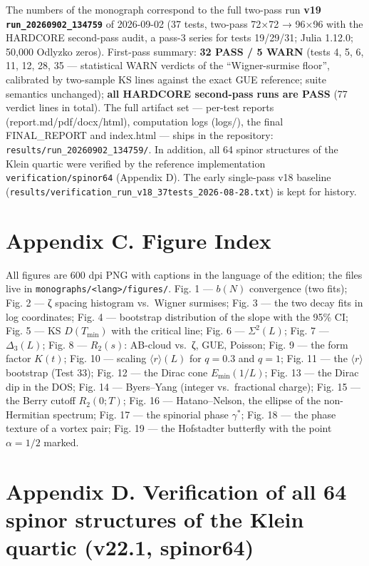 \documentclass[
]{article}
\begin{document}
The numbers of the monograph correspond to the full two-pass run
\textbf{v19 \texttt{run\_20260902\_134759}} of 2026-09-02 (37 tests,
two-pass 72×72 → 96×96 with the HARDCORE second-pass audit, a pass-3
series for tests 19/29/31; Julia 1.12.0; 50,000 Odlyzko zeros).
First-pass summary: \textbf{32 PASS / 5 WARN} (tests 4, 5, 6, 11, 12,
28, 35 --- statistical WARN verdicts of the ``Wigner-surmise floor'',
calibrated by two-sample KS lines against the exact GUE reference; suite
semantics unchanged); \textbf{all HARDCORE second-pass runs are PASS}
(77 verdict lines in total). The full artifact set --- per-test reports
(report.md/pdf/docx/html), computation logs (logs/), the final
FINAL\_REPORT and index.html --- ships in the repository:
\texttt{results/run\_20260902\_134759/}. In addition, all 64 spinor
structures of the Klein quartic were verified by the reference
implementation \texttt{verification/spinor64} (Appendix D). The early
single-pass v18 baseline
(\texttt{results/verification\_run\_v18\_37tests\_2026-08-28.txt}) is
kept for history.

\section{Appendix C. Figure Index}\label{appendix-c.-figure-index}

All figures are 600 dpi PNG with captions in the language of the
edition; the files live in
\texttt{monographs/\textless{}lang\textgreater{}/figures/}. Fig. 1 ---
\(b(N)\) convergence (two fits); Fig. 2 --- ζ spacing histogram
vs.~Wigner surmises; Fig. 3 --- the two decay fits in log coordinates;
Fig. 4 --- bootstrap distribution of the slope with the 95\% CI; Fig. 5
--- KS \(D(T_{\min})\) with the critical line; Fig. 6 ---
\(\Sigma^2(L)\); Fig. 7 --- \(\Delta_3(L)\); Fig. 8 --- \(R_2(s)\):
AB-cloud vs.~ζ, GUE, Poisson; Fig. 9 --- the form factor \(K(t)\); Fig.
10 --- scaling \(\langle r\rangle(L)\) for \(q=0.3\) and \(q=1\); Fig.
11 --- the \(\langle r\rangle\) bootstrap (Test 33); Fig. 12 --- the
Dirac cone \(E_{\min}(1/L)\); Fig. 13 --- the Dirac dip in the DOS; Fig.
14 --- Byers--Yang (integer vs.~fractional charge); Fig. 15 --- the
Berry cutoff \(R_2(0;T)\); Fig. 16 --- Hatano--Nelson, the ellipse of
the non-Hermitian spectrum; Fig. 17 --- the spinorial phase
\(\gamma^{\ast}\); Fig. 18 --- the phase texture of a vortex pair; Fig.
19 --- the Hofstadter butterfly with the point \(\alpha=1/2\) marked.

\section{Appendix D. Verification of all 64 spinor structures of the
Klein quartic (v22.1,
spinor64)}\label{appendix-d.-verification-of-all-64-spinor-structures-of-the-klein-quartic-v22.1-spinor64}
\end{document}
